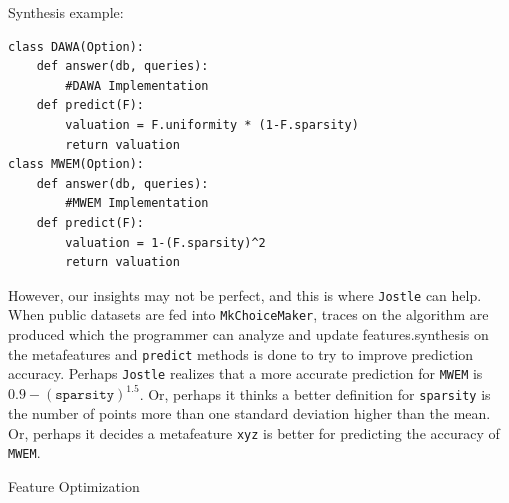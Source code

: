 \documentclass[11pt]{report}
\newcommand{\Jostle}{\texttt{Jostle}}
\renewcommand{\t}[1]{\texttt{#1}}
\begin{document}
Synthesis example:
\begin{lstlisting}[style=MyPythonStyle]
class DAWA(Option):
    def answer(db, queries):
        #DAWA Implementation
    def predict(F):
        valuation = F.uniformity * (1-F.sparsity)
        return valuation
class MWEM(Option):
    def answer(db, queries):
        #MWEM Implementation
    def predict(F):
        valuation = 1-(F.sparsity)^2
        return valuation
\end{lstlisting}

However, our insights may not be perfect, and this is where \Jostle{} can help. When public datasets are fed into \t{MkChoiceMaker}, traces on the algorithm are produced which the programmer can analyze and update features.synthesis on the metafeatures and \t{predict} methods is done to try to improve prediction accuracy. Perhaps \Jostle{} realizes that a more accurate prediction for \t{MWEM} is $0.9-(\t{sparsity})^{1.5}$. Or, perhaps it thinks a better definition for \t{sparsity} is the number of points more than one standard deviation higher than the mean. Or, perhaps it decides a metafeature \t{xyz} is better for predicting the accuracy of \t{MWEM}.

Feature Optimization


\end{document}
